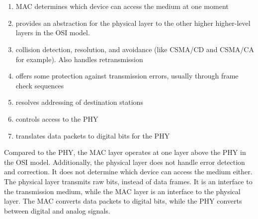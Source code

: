 \section{}

\begin{enumerate}
  \item MAC determines which device can access the medium at one moment
  \item provides an abstraction for the physical layer to the other higher
    higher-level layers in the OSI model. 
  \item collision detection, resolution, and avoidance (like CSMA/CD and CSMA/CA
    for example). Also handles retransmission
  \item offers some protection against transmission errors, usually through
    frame check sequences
  \item resolves addressing of destination stations
  \item controls access to the PHY
  \item translates data packets to digital bits for the PHY
\end{enumerate}

Compared to the PHY, the MAC layer operates at one layer above the PHY in the
OSI model. Additionally, the physical layer does not handle error detection and
correction. It does not determine which device can access the medium either. The
physical layer transmits raw bits, instead of data frames. It is an interface to
the transmission medium, while the MAC layer is an interface to the physical
layer. The MAC converts data packets to digital bits, while the PHY converts
between digital and analog signals.
